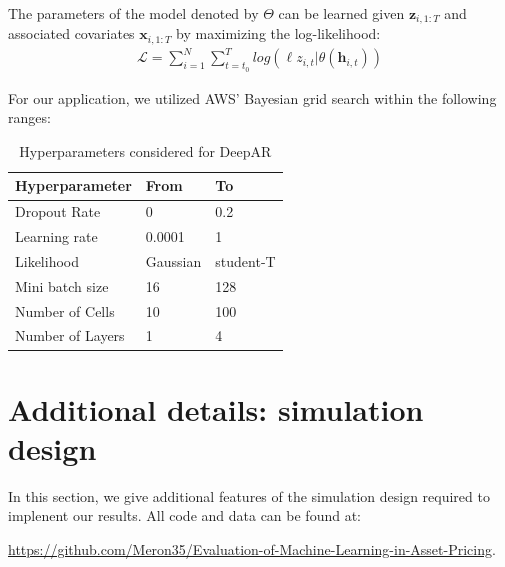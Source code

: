 \documentclass{article}
\newcommand{\zVec}[3]{\mathbf{z}_{#1, #2:#3}}
\newcommand{\xVec}[3]{\mathbf{x}_{#1, #2:#3}}
\begin{document}
The parameters of the model denoted by $\Theta$ can be learned given $\zVec{i}{1}{T}$ and associated covariates $\xVec{i}{1}{T}$ by maximizing the log-likelihood:
\begin{align}
	\mathcal{L} = \sum_{i = 1}^{N} \sum_{t = t_0}^{T} log(\ell z_{i, t} | \theta(\mathbf{h}_{i, t}))
\end{align}

For our application, we utilized AWS' Bayesian grid search within the following ranges:
\begin{table}[!htb]
	\begin{tabular}{|lll|}
		\hline
		Hyperparameter & From & To \\ \hline
		Dropout Rate & 0 & 0.2\\
		Learning rate & 0.0001 & 1\\
		Likelihood & Gaussian & student-T \\
		Mini batch size & 16 & 128 \\
		Number of Cells & 10 & 100\\
		Number of Layers & 1 & 4 \\ \hline
	\end{tabular}
	\caption{Hyperparameters considered for DeepAR}
\end{table}
\FloatBarrier

\newpage

\section{Additional details: simulation design}
In this section, we give additional features of the simulation design required to implenent our results. All code and data can be found at:

\url{https://github.com/Meron35/Evaluation-of-Machine-Learning-in-Asset-Pricing}.
\end{document}
